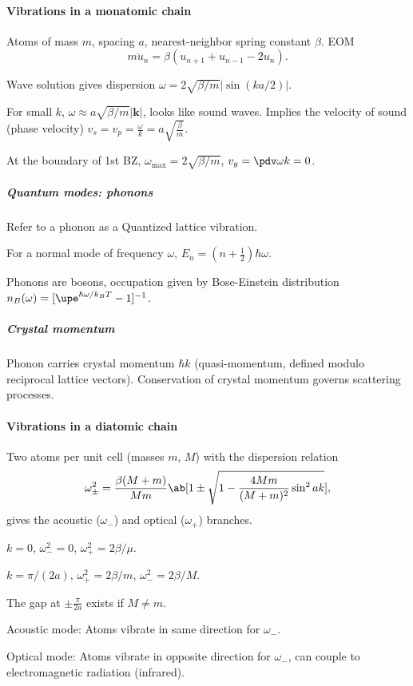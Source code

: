 \paragraph{Vibrations in a monatomic chain}

Atoms of mass $m$, spacing $a$, nearest-neighbor spring constant $\beta$.
EOM
\[
  m \ddot{u}_n = \beta(u_{n+1} + u_{n-1} - 2u_n).
\]
\begin{enumext}
  \item Wave solution gives dispersion $\omega = 2\sqrt{\beta/m} |\sin(ka/2)|$.
  \item For small $k$, $\omega \approx a\sqrt{\beta/m}|\bm k|$, looks
  like sound waves. Implies the velocity
  of sound (phase velocity) $v_s = v_p = \frac\omega k = a\sqrt{\frac\beta m}$.
  \item At the boundary of 1st BZ, $\omega_{\max} = 2\sqrt{\beta/m}$,
  $v_g = \pdv\omega k = 0$.
\end{enumext}

\subparagraph{Quantum modes: phonons}

Refer to a phonon as a Quantized lattice vibration.
\begin{enumext}
  \item For a normal mode of frequency $\omega$,
  $E_n = (n + \frac12)\hbar\omega$.
  \item Phonons are bosons, occupation given by Bose-Einstein distribution
  $n_B(\omega) = [\upe^{\hbar\omega/k_B T} - 1]^{-1}$.
\end{enumext}

\subparagraph{Crystal momentum}

Phonon carries crystal momentum $\hbar k$ (quasi-momentum, defined modulo
reciprocal lattice vectors). Conservation of crystal momentum governs
scattering processes.


\paragraph{Vibrations in a diatomic chain}

Two atoms per unit cell (masses $m$, $M$) with the dispersion relation
\[
  \omega_\pm^2
= \frac{\beta(M + m)}{Mm}\ab[1 \pm \sqrt{1 - \frac{4Mm}{(M + m)^2}\sin^2ak}],
\]
gives the acoustic ($\omega_-$) and optical ($\omega_+$) branches.
\begin{enumext}
  \item $k = 0$, $\omega_-^2 = 0$, $\omega_+^2 = 2\beta/\mu$.
  \item $k = \pi/(2a)$, $\omega_+^2 = 2\beta/m$, $\omega_-^2 = 2\beta/M$.
\end{enumext}
The gap at $\pm\frac\pi{2a}$ exists if $M \neq m$.
\begin{enumext}
  \item Acoustic mode: Atoms vibrate in same direction for $\omega_-$.
  \item Optical mode: Atoms vibrate in opposite direction for $\omega_-$,
  can couple to electromagnetic radiation (infrared).
\end{enumext}

